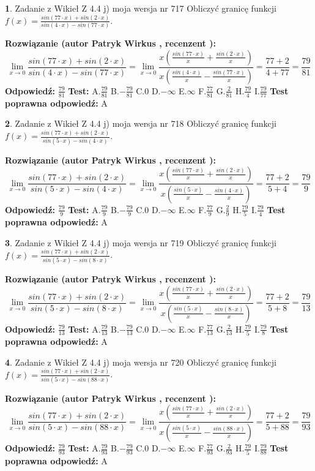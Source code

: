 \documentclass[12pt, a4paper]{article}
\theoremstyle{definition} %
\newtheorem{zad}{}
\newcommand{\zadStart}[1]{\begin{zad}#1\newline}
\newcommand{\zadStop}{\end{zad}}
\newcommand{\rozwStart}[2]{\noindent \textbf{Rozwiązanie (autor #1 , recenzent #2): }\newline}
\newcommand{\rozwStop}{\newline}
\newcommand{\odpStart}{\noindent \textbf{Odpowiedź:}\newline}
\newcommand{\odpStop}{\newline}
\newcommand{\testStart}{\noindent \textbf{Test:}\newline}
\newcommand{\testStop}{\newline}
\newcommand{\kluczStart}{\noindent \textbf{Test poprawna odpowiedź:}\newline}
\newcommand{\kluczStop}{\newline}
\begin{document}
\zadStart{Zadanie z Wikieł Z 4.4 j) moja wersja nr 717}
Obliczyć granicę funkcji $f(x)=\frac{sin(77\cdot x) +sin(2\cdot x)}{sin(4\cdot x) -sin(77\cdot x)}$.
\zadStop
\rozwStart{Patryk Wirkus}{}
$$\lim\limits_{x\to 0}\frac{sin(77\cdot x) +sin(2\cdot x)}{sin(4\cdot x) -sin(77\cdot x)}=\lim\limits_{x\to 0}\frac{x(\frac{sin(77\cdot x)}{x}+\frac{sin(2\cdot x)}{x})}{x(\frac{sin(4\cdot x)}{x}-\frac{sin(77\cdot x)}{x})}=\frac{77+2}{4+77} = \frac{79}{81}$$
\rozwStop
\odpStart
$\frac{79}{81}$
\odpStop
\testStart
A.$\frac{79}{81}$
B.$-\frac{79}{81}$
C.$0$
D.$-\infty$
E.$\infty$
F.$\frac{77}{81}$
G.$\frac{2}{81}$
H.$\frac{79}{4}$
I.$\frac{79}{77}$
\testStop
\kluczStart
A
\kluczStop



\zadStart{Zadanie z Wikieł Z 4.4 j) moja wersja nr 718}
Obliczyć granicę funkcji $f(x)=\frac{sin(77\cdot x) +sin(2\cdot x)}{sin(5\cdot x) -sin(4\cdot x)}$.
\zadStop
\rozwStart{Patryk Wirkus}{}
$$\lim\limits_{x\to 0}\frac{sin(77\cdot x) +sin(2\cdot x)}{sin(5\cdot x) -sin(4\cdot x)}=\lim\limits_{x\to 0}\frac{x(\frac{sin(77\cdot x)}{x}+\frac{sin(2\cdot x)}{x})}{x(\frac{sin(5\cdot x)}{x}-\frac{sin(4\cdot x)}{x})}=\frac{77+2}{5+4} = \frac{79}{9}$$
\rozwStop
\odpStart
$\frac{79}{9}$
\odpStop
\testStart
A.$\frac{79}{9}$
B.$-\frac{79}{9}$
C.$0$
D.$-\infty$
E.$\infty$
F.$\frac{77}{9}$
G.$\frac{2}{9}$
H.$\frac{79}{5}$
I.$\frac{79}{4}$
\testStop
\kluczStart
A
\kluczStop



\zadStart{Zadanie z Wikieł Z 4.4 j) moja wersja nr 719}
Obliczyć granicę funkcji $f(x)=\frac{sin(77\cdot x) +sin(2\cdot x)}{sin(5\cdot x) -sin(8\cdot x)}$.
\zadStop
\rozwStart{Patryk Wirkus}{}
$$\lim\limits_{x\to 0}\frac{sin(77\cdot x) +sin(2\cdot x)}{sin(5\cdot x) -sin(8\cdot x)}=\lim\limits_{x\to 0}\frac{x(\frac{sin(77\cdot x)}{x}+\frac{sin(2\cdot x)}{x})}{x(\frac{sin(5\cdot x)}{x}-\frac{sin(8\cdot x)}{x})}=\frac{77+2}{5+8} = \frac{79}{13}$$
\rozwStop
\odpStart
$\frac{79}{13}$
\odpStop
\testStart
A.$\frac{79}{13}$
B.$-\frac{79}{13}$
C.$0$
D.$-\infty$
E.$\infty$
F.$\frac{77}{13}$
G.$\frac{2}{13}$
H.$\frac{79}{5}$
I.$\frac{79}{8}$
\testStop
\kluczStart
A
\kluczStop



\zadStart{Zadanie z Wikieł Z 4.4 j) moja wersja nr 720}
Obliczyć granicę funkcji $f(x)=\frac{sin(77\cdot x) +sin(2\cdot x)}{sin(5\cdot x) -sin(88\cdot x)}$.
\zadStop
\rozwStart{Patryk Wirkus}{}
$$\lim\limits_{x\to 0}\frac{sin(77\cdot x) +sin(2\cdot x)}{sin(5\cdot x) -sin(88\cdot x)}=\lim\limits_{x\to 0}\frac{x(\frac{sin(77\cdot x)}{x}+\frac{sin(2\cdot x)}{x})}{x(\frac{sin(5\cdot x)}{x}-\frac{sin(88\cdot x)}{x})}=\frac{77+2}{5+88} = \frac{79}{93}$$
\rozwStop
\odpStart
$\frac{79}{93}$
\odpStop
\testStart
A.$\frac{79}{93}$
B.$-\frac{79}{93}$
C.$0$
D.$-\infty$
E.$\infty$
F.$\frac{77}{93}$
G.$\frac{2}{93}$
H.$\frac{79}{5}$
I.$\frac{79}{88}$
\testStop
\kluczStart
A
\kluczStop
\end{document}
